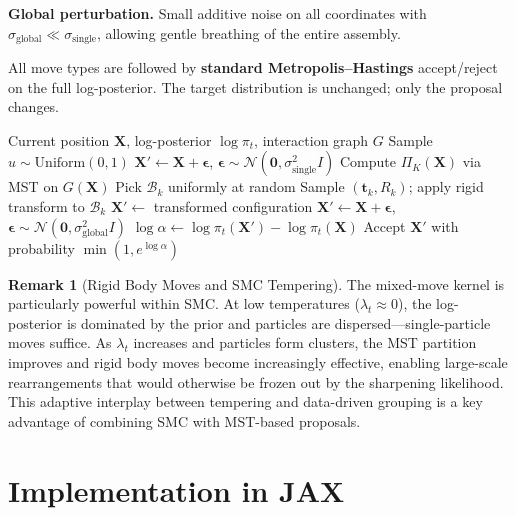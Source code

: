 \documentclass[11pt,a4paper]{article}
\newcommand{\bX}{\mathbf{X}}
\newcommand{\Normal}{\mathcal{N}}
\theoremstyle{definition}
\newtheorem{remark}{Remark}
\begin{document}
\textbf{Global perturbation.} Small additive noise on all coordinates with $\sigma_{\text{global}} \ll \sigma_{\text{single}}$, allowing gentle breathing of the entire assembly.

All move types are followed by \textbf{standard Metropolis--Hastings} accept/reject on the full log-posterior. The target distribution is unchanged; only the proposal changes.

\begin{algorithm}[H]
\caption{Mixed-Move MCMC Mutation (one step within SMC)}
\begin{algorithmic}[1]
\REQUIRE Current position $\bX$, log-posterior $\log\pi_t$, interaction graph $G$
\STATE Sample $u \sim \text{Uniform}(0,1)$
    \STATE $\bX' \gets \bX + \boldsymbol{\epsilon}$, \quad $\boldsymbol{\epsilon} \sim \Normal(\mathbf{0}, \sigma_{\text{single}}^2 I)$
    \STATE Compute $\Pi_K(\bX)$ via MST on $G(\bX)$ 
    \STATE Pick $\mathcal{B}_k$ uniformly at random
    \STATE Sample $(\mathbf{t}_k, R_k)$; apply rigid transform to $\mathcal{B}_k$ 
    \STATE $\bX' \gets$ transformed configuration
\ELSE
    \STATE $\bX' \gets \bX + \boldsymbol{\epsilon}$, \quad $\boldsymbol{\epsilon} \sim \Normal(\mathbf{0}, \sigma_{\text{global}}^2 I)$
\ENDIF
\STATE $\log\alpha \gets \log\pi_t(\bX') - \log\pi_t(\bX)$
\STATE Accept $\bX' $ with probability $\min(1, e^{\log\alpha})$
\end{algorithmic}
\end{algorithm}

\begin{remark}[Rigid Body Moves and SMC Tempering]
The mixed-move kernel is particularly powerful within SMC. At low temperatures ($\lambda_t \approx 0$), the log-posterior is dominated by the prior and particles are dispersed---single-particle moves suffice. As $\lambda_t$ increases and particles form clusters, the MST partition improves and rigid body moves become increasingly effective, enabling large-scale rearrangements that would otherwise be frozen out by the sharpening likelihood. This adaptive interplay between tempering and data-driven grouping is a key advantage of combining SMC with MST-based proposals.
\end{remark}

\section{Implementation in JAX}
\end{document}
